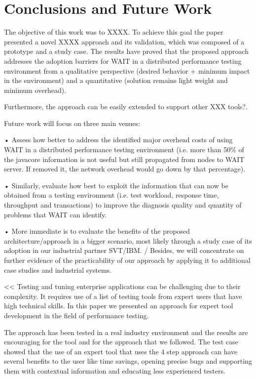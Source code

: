 \documentclass[runningheads,a4paper]{llncs}
\begin{document}
\section{Conclusions and Future Work}

The objective of this work was to XXXX. To achieve this goal the 
paper presented a novel XXXX approach and its validation, which was composed of
a prototype and a study case. The results have proved that the 
proposed approach addresses the adoption barriers for WAIT in a
distributed performance testing environment from a qualitative perspective 
(desired behavior + minimum impact in the environment) and a quantitative 
(solution remains light weight and minimum overhead).

Furthermore, the approach can be easily extended to support other XXX tools?.

Future work will focus on three main venues:

• Assess how better to address the identified major overhead costs of using WAIT
in a distributed performance testing environment (i.e. more than 50\% of the
javacore information is not useful but still propagated from nodes to WAIT server. 
If removed it, the network overhead would go down by that percentage).

• Similarly, evaluate how best to exploit the information that can now be
obtained from a testing environment (i.e. test workload, response time, throughput and 
transactions) to improve the diagnosis quality and quantity of problems that WAIT can 
identify.

• More immediate is to evaluate the benefits of the proposed
architecture/approach in a bigger scenario, most likely through a study case of its 
adoption in our industrial partner SVT/IBM. 
/ 
Besides, we will concentrate on
further evidence of the practicability of our approach by applying it to additional case studies and industrial systems.

<<
Testing and tuning enterprise applications can be
challenging due to their complexity. It requires use of a list of testing tools from expert users that have high technical skills. 
In this paper we presented an approach for expert tool
development in the field of performance testing. 

The approach has been tested in a real industry environment and the results are encouraging for the tool and for the approach that we followed. 
The test case showed that the use of an expert tool that uses the 4 step approach can have several benefits to the user like time savings, opening 
precise bugs and supporting them with contextual information and educating less
experienced testers.
\end{document}
